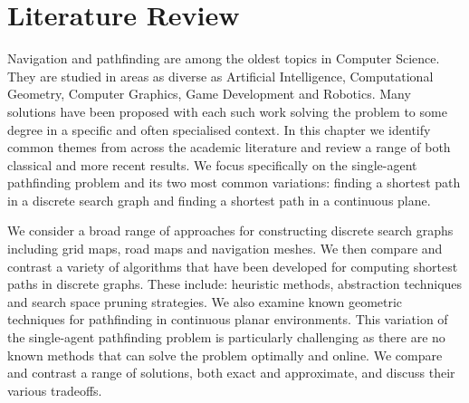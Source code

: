 \chapter{Literature Review}
\label{cha::lit}
Navigation and pathfinding are among the oldest topics in Computer Science.
They are studied in areas as diverse as Artificial Intelligence, 
Computational Geometry, Computer Graphics, Game Development and Robotics. 
Many solutions have been proposed with each such work solving the problem to 
some degree in a specific and often specialised context.
In this chapter we identify common themes from across the academic 
literature and review a range of both classical and more recent results.
We focus specifically on the single-agent pathfinding problem and its
two most common variations: finding a shortest path in a discrete search graph 
and finding a shortest path in a continuous plane.

We consider a broad range of approaches for constructing discrete search graphs
including grid maps, road maps and navigation meshes.  We then compare and
contrast a variety of algorithms that have been developed for computing shortest paths in 
discrete graphs. These include: heuristic methods, 
abstraction techniques and search space pruning strategies.  
We also examine known geometric techniques for pathfinding in continuous planar 
environments. This variation of the single-agent pathfinding problem is
particularly challenging as there are no known methods that can solve the
problem optimally and online.  We compare and contrast a range of solutions,
both exact and approximate, and discuss their various tradeoffs.


